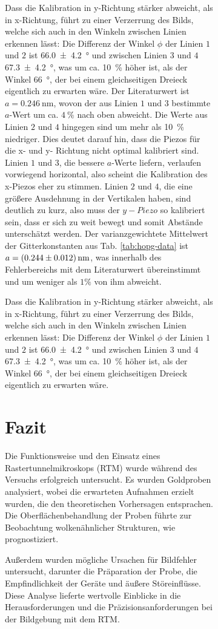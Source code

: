\documentclass{article}
\begin{document}
\begin{figure}[h]
\begin{figure}[h]
Dass die Kalibration in y-Richtung stärker abweicht, als in x-Richtung,
führt zu einer Verzerrung des Bilds, welche sich auch in den Winkeln zwischen Linien erkennen lässt: Die Differenz der
Winkel $\phi$ der Linien $1$ und $2$ ist \SI{66.0\pm 4.2}{\degree} und zwischen Linien $3$ und $4$ \SI{67.3\pm 4.2}{\degree},
was um ca. \SI{10}{\percent} höher ist, als der Winkel \SI{66}{\degree}, der bei einem gleichseitigen Dreieck eigentlich zu
erwarten wäre.
Der Literaturwert ist $a=\SI{0.246}{\nm}$, wovon der aus Linien $1$ und $3$ bestimmte $a$-Wert um ca. $\SI{4}{\percent}$
nach oben abweicht. Die Werte aus Linien $2$ und $4$ hingegen sind um mehr als \SI{10}{\percent} niedriger.
Dies deutet darauf hin, dass die Piezos für die x- und y- Richtung nicht optimal kalibriert sind.
Linien $1$ und $3$, die bessere $a$-Werte liefern, verlaufen vorwiegend horizontal, also scheint die Kalibration des x-Piezos
eher zu stimmen. Linien $2$ und $4$, die eine größere Ausdehnung in der Vertikalen haben, sind deutlich zu kurz,
also muss der $y-Piezo$ so kalibriert sein, dass er sich zu weit bewegt und somit Abstände unterschätzt werden.
Der varianzgewichtete Mittelwert der Gitterkonstanten aus Tab. \ref{tab:hopg-data} ist $a = \SI{0.244\pm0.012}{\nm}$,
was innerhalb des Fehlerbereichs mit dem Literaturwert übereinstimmt und um weniger als $1\%$ von ihm abweicht.

Dass die Kalibration in y-Richtung stärker abweicht, als in x-Richtung,
führt zu einer Verzerrung des Bilds, welche sich auch in den Winkeln zwischen Linien erkennen lässt: Die Differenz der
Winkel $\phi$ der Linien $1$ und $2$ ist \SI{66.0\pm 4.2}{\degree} und zwischen Linien $3$ und $4$ \SI{67.3\pm 4.2}{\degree},
was um ca. \SI{10}{\percent} höher ist, als der Winkel \SI{66}{\degree}, der bei einem gleichseitigen Dreieck eigentlich zu
erwarten wäre.


\clearpage
\section{Fazit}
Die Funktionsweise und den Einsatz eines Rastertunnelmikroskops (RTM) wurde während des Versuchs erfolgreich untersucht. Es wurden Goldproben analysiert, wobei die erwarteten Aufnahmen erzielt wurden, die den theoretischen Vorhersagen entsprachen. Die Oberflächenbehandlung der Proben führte zur Beobachtung wolkenähnlicher Strukturen, wie prognostiziert. 

Außerdem wurden mögliche Ursachen für Bildfehler untersucht, darunter die Präparation der Probe, die Empfindlichkeit der Geräte und äußere Störeinflüsse. Diese Analyse lieferte wertvolle Einblicke in die Herausforderungen und die Präzisionsanforderungen bei der Bildgebung mit dem RTM.








\end{figure}
\end{figure}
\end{document}
